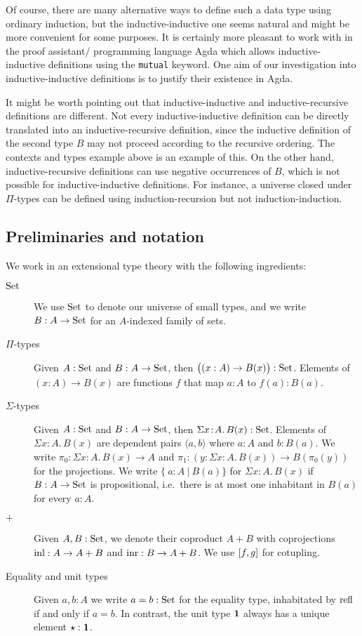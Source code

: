 \documentclass[orivec,envcountsame, ,envcountsect]{llncs}
\begin{document}
Of course, there are many alternative ways to define such a data type
using ordinary induction, but the inductive-inductive one seems
natural and might be more convenient for some purposes. It is
certainly more pleasant to work with in the proof assistant/
programming language Agda \cite{norell2007thesis} which allows
inductive-inductive definitions using the \texttt{mutual} keyword. One
aim of our investigation into inductive-inductive definitions is to
justify their existence in Agda.

It might be worth pointing out that inductive-inductive and
inductive-recursive definitions are different. Not every
inductive-inductive definition can be directly %
translated into an inductive-recursive definition, since
the inductive definition of the second type $B$ may not proceed
according to the recursive ordering. The 
contexts and types example above is an example of this. On the other
hand, inductive-recursive definitions can use negative occurrences of
$B$, which is not possible for inductive-inductive definitions. For
instance, a universe closed under $\Pi$-types can be defined using
induction-recursion but not induction-induction.




\subsection{Preliminaries and notation}

We work in an extensional type theory \cite{NPS1990book} with the
following ingredients:
\begin{description}
\item[$\text{Set}$] We use $\text{Set}$ to denote our universe of small types, and
  we write $B : A \to \text{Set}$ for an $A$-indexed family of sets.
\item[$\Pi$-types] Given $A : \text{Set}$ and $B : A \to \text{Set}$, then $\big((x :
  A) \to B(x)\big) : \text{Set}$.  Elements of $(x : A) \to B(x)$ are
  functions $f$ that map $a : A$ to $f(a) : B(a)$.
\item[$\Sigma$-types] Given $A : \text{Set}$ and $B : A \to \text{Set}$, then
  $\Sigma x\!:\!A.\, B(x) : \text{Set}$. Elements of $\Sigma x\!:\!A.\,
  B(x)$ are dependent pairs $\langle a, b\rangle$ where $a : A$ and $b : B(a)$.
  We write $\pi_0 : \Sigma x\!:\!A.\, B(x) \to A$ and $\pi_1 : (y :
  \Sigma x\!:\!A.\, B(x)) \to B(\pi_0(y))$ for the projections. We write $\{\ a : A\ |\
  B(a)\}$ for $\Sigma x\!:\!A.\, B(x)$ if $B
  : A \to \text{Set}$ is propositional, i.e.\ there is at most one
  inhabitant in $B(a)$ for every $a : A$.
\item[$+$] Given $A, B : \text{Set}$, we denote their coproduct $A + B$ with
  coprojections $\text{inl} : A \to A + B$ and $\text{inr} : B \to A + B$. We
  use $[f, g]$ for cotupling.
\item[Equality and unit types] Given $a, b : A$ we write $a = b :
  \text{Set}$ for the equality type, inhabitated by $\text{refl}$ if and only if
  $a = b$. In contrast, the unit type $\mathbf{1}$ always has a unique
  element $\star : \mathbf{1}$.
\end{description}
\end{document}
